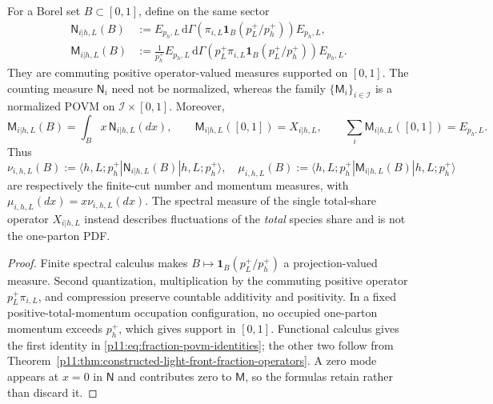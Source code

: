 \documentclass[12pt,a4paper]{article}
\begin{document}
\begin{theorem}
\label{p11:thm:light-front-fraction-povms}
For a Borel set \(B\subset[0,1]\), define on the same sector
\begin{align}
\label{p11:eq:parton-number-povm}
\mathsf N_{i|h,L}(B)
&:=E_{p_h,L}\,\mathrm d\Gamma\!\left(
\pi_{i,L}\mathbf 1_B(p_L^+/p_h^+)\right)E_{p_h,L},\\
\label{p11:eq:parton-momentum-povm}
\mathsf M_{i|h,L}(B)
&:=\frac{1}{p_h^+}E_{p_h,L}\,\mathrm d\Gamma\!\left(
p_L^+\pi_{i,L}\mathbf 1_B(p_L^+/p_h^+)\right)E_{p_h,L}.
\end{align}
They are commuting positive operator-valued measures supported on \([0,1]\).
The counting measure \(\mathsf N_i\) need not be normalized, whereas the family
\(\{\mathsf M_i\}_{i\in\mathcal I}\) is a normalized POVM on
\(\mathcal I\times[0,1]\).  Moreover,
\begin{equation}
\label{p11:eq:fraction-povm-identities}
\mathsf M_{i|h,L}(B)=\int_Bx\,\mathsf N_{i|h,L}(dx),\qquad
\mathsf M_{i|h,L}([0,1])=X_{i|h,L},\qquad
\sum_i\mathsf M_{i|h,L}([0,1])=E_{p_h,L}.
\end{equation}
Thus
\begin{equation}
\label{p11:eq:finite-cut-pdf-measures}
\nu_{i,h,L}(B):=\langle h,L;p_h^+|\mathsf N_{i|h,L}(B)|h,L;p_h^+\rangle,
\quad
\mu_{i,h,L}(B):=\langle h,L;p_h^+|\mathsf M_{i|h,L}(B)|h,L;p_h^+\rangle
\end{equation}
are respectively the finite-cut number and momentum measures, with
\(\mu_{i,h,L}(dx)=x\nu_{i,h,L}(dx)\).  The spectral measure of the single
total-share operator \(X_{i|h,L}\) instead describes fluctuations of the
\emph{total} species share and is not the one-parton PDF.
\end{theorem}
\begin{proof}
Finite spectral calculus makes \(B\mapsto\mathbf1_B(p_L^+/p_h^+)\) a
projection-valued measure.  Second quantization, multiplication by the
commuting positive operator \(p_L^+\pi_{i,L}\), and compression preserve
countable additivity and positivity.  In a fixed positive-total-momentum
occupation configuration, no occupied one-parton momentum exceeds \(p_h^+\),
which gives support in \([0,1]\).  Functional calculus gives the first identity
in \eqref{p11:eq:fraction-povm-identities}; the other two follow from
Theorem~\ref{p11:thm:constructed-light-front-fraction-operators}.  A zero mode
appears at \(x=0\) in \(\mathsf N\) and contributes zero to \(\mathsf M\), so
the formulas retain rather than discard it.
\end{proof}
\end{document}
